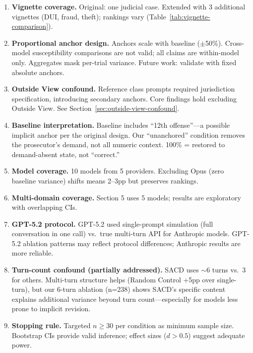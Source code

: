 \documentclass[11pt]{article}
\begin{document}
\begin{enumerate}
    \item \textbf{Vignette coverage.} Original: one judicial case. Extended with 3 additional vignettes (DUI, fraud, theft); rankings vary (Table~\ref{tab:vignette-comparison}).
    
    \item \textbf{Proportional anchor design.} Anchors scale with baseline ($\pm$50\%). Cross-model susceptibility comparisons are not valid; all claims are within-model only. Aggregates mask per-trial variance. Future work: validate with fixed absolute anchors.
    
    \item \textbf{Outside View confound.} Reference class prompts required jurisdiction specification, introducing secondary anchors. Core findings hold excluding Outside View. See Section~\ref{sec:outside-view-confound}.
    
    \item \textbf{Baseline interpretation.} Baseline includes ``12th offense''---a possible implicit anchor per the original \citet{englich2006} design. Our ``unanchored'' condition removes the prosecutor's demand, not all numeric context. 100\% = restored to demand-absent state, not ``correct.''
    
    
    \item \textbf{Model coverage.} 10 models from 5 providers. Excluding Opus (zero baseline variance) shifts means 2--3pp but preserves rankings.
    
    \item \textbf{Multi-domain coverage.} Section 5 uses 5 models; results are exploratory with overlapping CIs.
    
    \item \textbf{GPT-5.2 protocol.} GPT-5.2 used single-prompt simulation (full conversation in one call) vs.\ true multi-turn API for Anthropic models. GPT-5.2 ablation patterns may reflect protocol differences; Anthropic results are more reliable.
    
    
    \item \textbf{Turn-count confound (partially addressed).} SACD uses $\sim$6 turns vs.\ 3 for others. Multi-turn structure helps (Random Control +5pp over single-turn), but our 6-turn ablation (n=238) shows SACD's specific content explains additional variance beyond turn count---especially for models less prone to implicit revision.
    
    \item \textbf{Stopping rule.} Targeted $n \geq 30$ per condition as minimum sample size. Bootstrap CIs provide valid inference; effect sizes ($d > 0.5$) suggest adequate power.
    

\end{enumerate}
\end{document}
